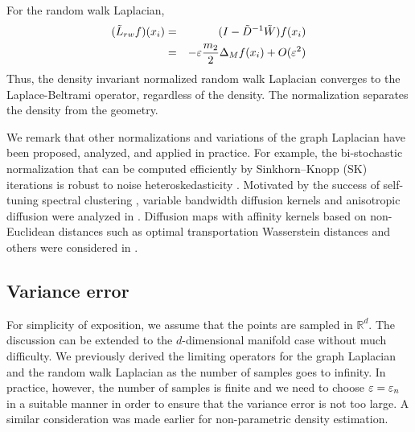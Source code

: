For the random walk Laplacian,
\begin{eqnarray*}
(\tilde{L}_{rw}f)(x_i) &=& (I-\tilde{D}^{-1}\tilde{W})f(x_i) \\
&=& -\varepsilon \frac{m_2}{2}\Delta_M f(x_i) + O(\varepsilon^2)
\end{eqnarray*}
Thus, the density invariant normalized random walk Laplacian converges to the Laplace-Beltrami operator, regardless of the density. The normalization separates the density from the geometry.

We remark that other normalizations and variations of the graph Laplacian have been proposed, analyzed, and applied in practice. For example, the bi-stochastic normalization that can be computed efficiently by Sinkhorn–Knopp (SK) iterations is robust to noise heteroskedasticity \cite{landa2021doubly,cheng2024bi}. Motivated by the success of self-tuning spectral clustering \cite{zelnik2004self}, variable bandwidth diffusion kernels and anisotropic diffusion were analyzed in \cite{singer2008non,berry2016variable}. Diffusion maps with affinity kernels based on non-Euclidean distances such as optimal transportation Wasserstein distances and others were considered in \cite{kileel2021manifold,Xu2026}.        

\subsection{Variance error}
For simplicity of exposition, we assume that the points are sampled in $\mathbb{R}^d$. The discussion can be extended to the $d$-dimensional manifold case without much difficulty.
We previously derived the limiting operators for the graph Laplacian and the random walk Laplacian as the number of samples goes to infinity. In practice, however, the number of samples is finite and we need to choose $\varepsilon = \varepsilon_n$ in a suitable manner in order to ensure that the variance error is not too large. A similar consideration was made earlier for non-parametric density estimation. 

